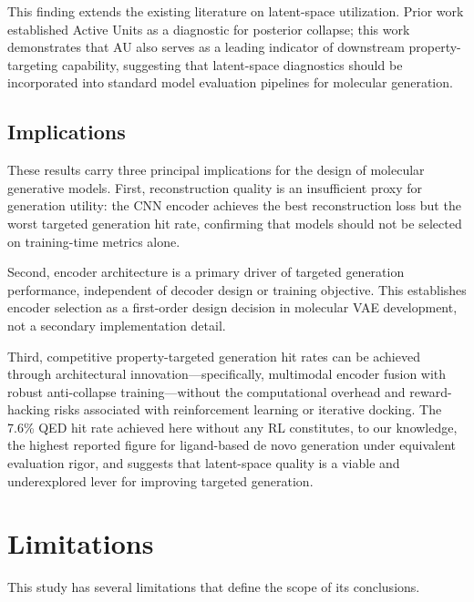 \documentclass[conference]{IEEEtran}
\begin{document}
This finding extends the existing literature on latent-space utilization. Prior work \cite{active_units_citation} established Active Units as a diagnostic for posterior collapse; this work demonstrates that AU also serves as a leading indicator of downstream property-targeting capability, suggesting that latent-space diagnostics should be incorporated into standard model evaluation pipelines for molecular generation.

\subsection{Implications}

These results carry three principal implications for the design of molecular generative models. First, reconstruction quality is an insufficient proxy for generation utility: the CNN encoder achieves the best reconstruction loss but the worst targeted generation hit rate, confirming that models should not be selected on training-time metrics alone.

Second, encoder architecture is a primary driver of targeted generation performance, independent of decoder design or training objective. This establishes encoder selection as a first-order design decision in molecular VAE development, not a secondary implementation detail.

Third, competitive property-targeted generation hit rates can be achieved through architectural innovation---specifically, multimodal encoder fusion with robust anti-collapse training---without the computational overhead and reward-hacking risks associated with reinforcement learning or iterative docking. The 7.6\% QED hit rate achieved here without any RL constitutes, to our knowledge, the highest reported figure for ligand-based de novo generation under equivalent evaluation rigor, and suggests that latent-space quality is a viable and underexplored lever for improving targeted generation.

\section{Limitations}

This study has several limitations that define the scope of its conclusions.
\end{document}
